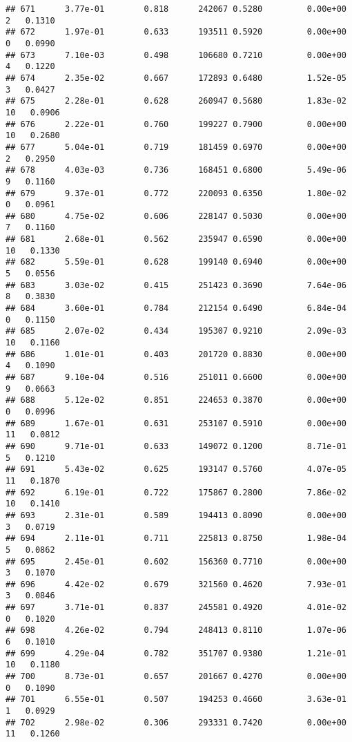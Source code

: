 \documentclass[
]{article}
\begin{document}
\begin{verbatim}
## 671      3.77e-01        0.818      242067 0.5280         0.00e+00   2   0.1310
## 672      1.97e-01        0.633      193511 0.5920         0.00e+00   0   0.0990
## 673      7.10e-03        0.498      106680 0.7210         0.00e+00   4   0.1220
## 674      2.35e-02        0.667      172893 0.6480         1.52e-05   3   0.0427
## 675      2.28e-01        0.628      260947 0.5680         1.83e-02  10   0.0906
## 676      2.22e-01        0.760      199227 0.7900         0.00e+00  10   0.2680
## 677      5.04e-01        0.719      181459 0.6970         0.00e+00   2   0.2950
## 678      4.03e-03        0.736      168451 0.6800         5.49e-06   9   0.1160
## 679      9.37e-01        0.772      220093 0.6350         1.80e-02   0   0.0961
## 680      4.75e-02        0.606      228147 0.5030         0.00e+00   7   0.1160
## 681      2.68e-01        0.562      235947 0.6590         0.00e+00  10   0.1330
## 682      5.59e-01        0.628      199140 0.6940         0.00e+00   5   0.0556
## 683      3.03e-02        0.415      251423 0.3690         7.64e-06   8   0.3830
## 684      3.60e-01        0.784      212154 0.6490         6.84e-04   0   0.1150
## 685      2.07e-02        0.434      195307 0.9210         2.09e-03  10   0.1160
## 686      1.01e-01        0.403      201720 0.8830         0.00e+00   4   0.1090
## 687      9.10e-04        0.516      251011 0.6600         0.00e+00   9   0.0663
## 688      5.12e-02        0.851      224653 0.3870         0.00e+00   0   0.0996
## 689      1.67e-01        0.631      253107 0.5910         0.00e+00  11   0.0812
## 690      9.71e-01        0.633      149072 0.1200         8.71e-01   5   0.1210
## 691      5.43e-02        0.625      193147 0.5760         4.07e-05  11   0.1870
## 692      6.19e-01        0.722      175867 0.2800         7.86e-02  10   0.1410
## 693      2.31e-01        0.589      194413 0.8090         0.00e+00   3   0.0719
## 694      2.11e-01        0.711      225813 0.8750         1.98e-04   5   0.0862
## 695      2.45e-01        0.602      156360 0.7710         0.00e+00   3   0.1070
## 696      4.42e-02        0.679      321560 0.4620         7.93e-01   3   0.0846
## 697      3.71e-01        0.837      245581 0.4920         4.01e-02   0   0.1020
## 698      4.26e-02        0.794      248413 0.8110         1.07e-06   6   0.1010
## 699      4.29e-04        0.782      351707 0.9380         1.21e-01  10   0.1180
## 700      8.73e-01        0.657      201667 0.4270         0.00e+00   0   0.1090
## 701      6.55e-01        0.507      194253 0.4660         3.63e-01   1   0.0929
## 702      2.98e-02        0.306      293331 0.7420         0.00e+00  11   0.1260

\end{verbatim}
\end{document}
